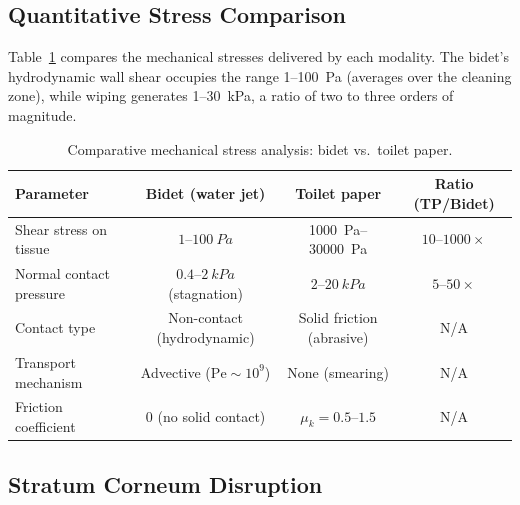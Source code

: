 \documentclass[aps,prfluids,reprint,amsmath,amssymb,floatfix]{revtex4-2}
\newcommand{\Pe}{\mathrm{Pe}}
\begin{document}
\subsection{Quantitative Stress Comparison}

Table~\ref{tab:stresscomparison} compares the mechanical stresses delivered
by each modality. The bidet's hydrodynamic wall shear occupies the range
1--\SI{100}{Pa} (averages over the cleaning zone), while wiping
generates 1--\SI{30}{kPa}, a ratio of two to three orders of
magnitude.

\begin{table}[t]
\centering
\caption{Comparative mechanical stress analysis: bidet vs.\ toilet paper.}
\label{tab:stresscomparison}
\begin{tabular}{lccc}
\toprule
\textbf{Parameter} & \textbf{Bidet (water jet)} & \textbf{Toilet paper} & \textbf{Ratio (TP/Bidet)}\\
\midrule
Shear stress on tissue     & $1$--$\SI{100}{Pa}$    & \SI{1000}{Pa}--\SI{30000}{Pa} & $10$--$1000\times$\\
Normal contact pressure    & $0.4$--$\SI{2}{kPa}$ (stagnation) & $2$--$\SI{20}{kPa}$ & $5$--$50\times$\\
Contact type               & Non-contact (hydrodynamic) & Solid friction (abrasive) & N/A\\
Transport mechanism        & Advective ($\Pe \sim 10^9$)   & None (smearing)         & N/A\\
Friction coefficient       & $0$ (no solid contact) & $\mu_k = 0.5$--$1.5$   & N/A\\
\bottomrule
\end{tabular}
\end{table}%

\subsection{Stratum Corneum Disruption}
\label{subsec:SC}
\end{document}
